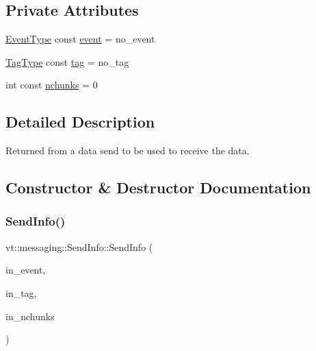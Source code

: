 \subsection*{Private Attributes}
\begin{DoxyCompactItemize}
\item 
\hyperlink{namespacevt_a009267401def7ae8bf201892222d060f}{Event\+Type} const \hyperlink{structvt_1_1messaging_1_1_send_info_a402eb83d6c831639bf01b07f4096d313}{event} = no\+\_\+event
\item 
\hyperlink{namespacevt_a84ab281dae04a52a4b243d6bf62d0e52}{Tag\+Type} const \hyperlink{structvt_1_1messaging_1_1_send_info_a2019e919629f4d5e3f3bca818136535b}{tag} = no\+\_\+tag
\item 
int const \hyperlink{structvt_1_1messaging_1_1_send_info_ada975d93f03f94b12c35442b27359f50}{nchunks} = 0
\end{DoxyCompactItemize}


\subsection{Detailed Description}
Returned from a data send to be used to receive the data. 

\subsection{Constructor \& Destructor Documentation}
\mbox{\label{structvt_1_1messaging_1_1_send_info_a29c15fdc6ded2e3fcd64ad76957009bc}} 
\subsubsection{\texorpdfstring{Send\+Info()}{SendInfo()}}
{\footnotesize\ttfamily vt\+::messaging\+::\+Send\+Info\+::\+Send\+Info (\begin{DoxyParamCaption}\item[{\hyperlink{namespacevt_a009267401def7ae8bf201892222d060f}{Event\+Type}}]{in\+\_\+event,  }\item[{\hyperlink{namespacevt_a84ab281dae04a52a4b243d6bf62d0e52}{Tag\+Type}}]{in\+\_\+tag,  }\item[{int}]{in\+\_\+nchunks }\end{DoxyParamCaption})\hspace{0.3cm}{\ttfamily [inline]}}



